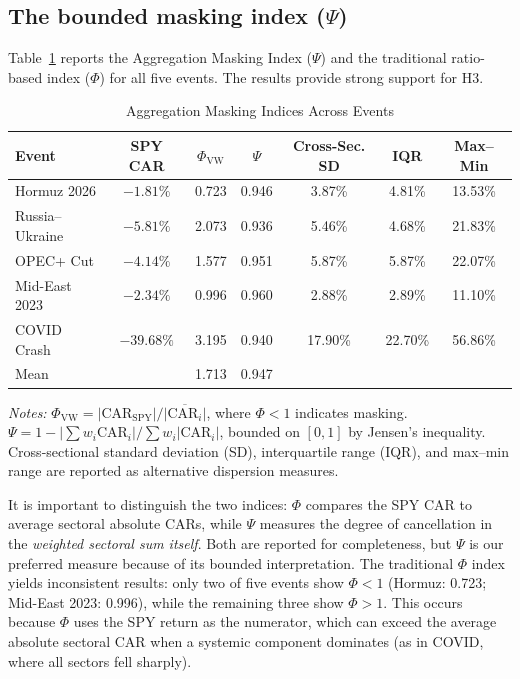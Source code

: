 \documentclass[12pt,preprint,authoryear]{elsarticle}
\begin{document}
\subsection{The bounded masking index ($\Psi$)}
Table~\ref{tab:psi} reports the Aggregation Masking Index ($\Psi$) and the traditional ratio-based index ($\Phi$) for all five events. The results provide strong support for H3.

\begin{table}[H]
\centering
\caption{Aggregation Masking Indices Across Events}
\label{tab:psi}
\begin{threeparttable}
\begin{tabular}{lcccccc}
\toprule
Event & SPY CAR & $\Phi_{\text{VW}}$ & $\Psi$ & Cross-Sec. SD & IQR & Max--Min \\
\midrule
Hormuz 2026 & $-1.81\%$ & 0.723 & 0.946 & 3.87\% & 4.81\% & 13.53\% \\
Russia--Ukraine & $-5.81\%$ & 2.073 & 0.936 & 5.46\% & 4.68\% & 21.83\% \\
OPEC+ Cut & $-4.14\%$ & 1.577 & 0.951 & 5.87\% & 5.87\% & 22.07\% \\
Mid-East 2023 & $-2.34\%$ & 0.996 & 0.960 & 2.88\% & 2.89\% & 11.10\% \\
COVID Crash & $-39.68\%$ & 3.195 & 0.940 & 17.90\% & 22.70\% & 56.86\% \\
\midrule
Mean & & 1.713 & 0.947 & & & \\
\bottomrule
\end{tabular}
\begin{tablenotes}[flushleft]\footnotesize
\item \textit{Notes:} $\Phi_{\text{VW}} = |\text{CAR}_{\text{SPY}}| / \overline{|\text{CAR}_i|}$, where $\Phi < 1$ indicates masking. $\Psi = 1 - |\sum w_i \text{CAR}_i| / \sum w_i |\text{CAR}_i|$, bounded on $[0,1]$ by Jensen's inequality. Cross-sectional standard deviation (SD), interquartile range (IQR), and max--min range are reported as alternative dispersion measures.
\end{tablenotes}
\end{threeparttable}
\end{table}

It is important to distinguish the two indices: $\Phi$ compares the SPY CAR to average sectoral absolute CARs, while $\Psi$ measures the degree of cancellation in the \textit{weighted sectoral sum itself}. Both are reported for completeness, but $\Psi$ is our preferred measure because of its bounded interpretation. The traditional $\Phi$ index yields inconsistent results: only two of five events show $\Phi < 1$ (Hormuz: 0.723; Mid-East 2023: 0.996), while the remaining three show $\Phi > 1$. This occurs because $\Phi$ uses the SPY return as the numerator, which can exceed the average absolute sectoral CAR when a systemic component dominates (as in COVID, where all sectors fell sharply).
\end{document}
